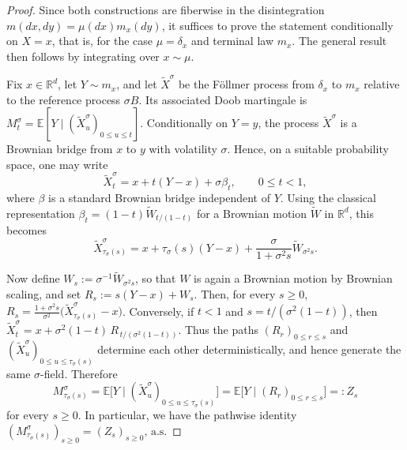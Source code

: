 \documentclass[reqno, a4paper]{amsart}
\theoremstyle{plain}
\theoremstyle{definition}
\theoremstyle{remark}
\numberwithin{equation}{section}
\numberwithin{theorem}{section}
\newcommand{\R}{\mathbb{R}}
\newcommand{\E}{\mathbb{E}}
\begin{document}
	\begin{proof}
		Since both constructions are fiberwise in the disintegration \(m(dx,dy)=\mu(dx)m_x(dy)\), it suffices to prove the statement conditionally on \(X=x\), that is, for the case \(\mu=\delta_x\) and terminal law \(m_x\). The general result then follows by integrating over \(x\sim\mu\).
		
		Fix \(x\in\R^d\), let \(Y\sim m_x\), and let \(\widetilde X^\sigma\) be the F\"ollmer process from \(\delta_x\) to \(m_x\) relative to the reference process \(\sigma B\). Its associated Doob martingale is \(M_t^\sigma=\E[Y\mid (\widetilde X_u^\sigma)_{0\le u\le t}]\). Conditionally on \(Y=y\), the process \(\widetilde X^\sigma\) is a Brownian bridge from \(x\) to \(y\) with volatility \(\sigma\). Hence, on a suitable probability space, one may write
		\[
		\widetilde X_t^\sigma=x+t(Y-x)+\sigma \beta_t,\qquad 0\le t<1,
		\]
		where \(\beta\) is a standard Brownian bridge independent of \(Y\). Using the classical representation \(\beta_t=(1-t)\widetilde W_{t/(1-t)}\) for a Brownian motion \(\widetilde W\) in \(\R^d\), this becomes
		\[
		\widetilde X_{\tau_\sigma(s)}^\sigma
		=
		x+\tau_\sigma(s)(Y-x)+\frac{\sigma}{1+\sigma^2 s}\widetilde W_{\sigma^2 s}.
		\]
		
		Now define \(W_s:=\sigma^{-1}\widetilde W_{\sigma^2 s}\), so that \(W\) is again a Brownian motion by Brownian scaling, and set \(R_s:=s(Y-x)+W_s\). Then, for every \(s\ge0\),
		$
		R_s=\frac{1+\sigma^2 s}{\sigma^2}\bigl(\widetilde X_{\tau_\sigma(s)}^\sigma-x\bigr)
		$. 
		Conversely, if \(t<1\) and \(s=t/(\sigma^2(1-t))\), then
		$
		\widetilde X_t^\sigma=x+\sigma^2(1-t)\,R_{\,t/(\sigma^2(1-t))}
		$. 
		Thus the paths \((R_r)_{0\le r\le s}\) and \((\widetilde X_u^\sigma)_{0\le u\le \tau_\sigma(s)}\) determine each other deterministically, and hence generate the same \(\sigma\)-field. Therefore
		\[
		M_{\tau_\sigma(s)}^\sigma
		=
		\E\big[Y\mid (\widetilde X_u^\sigma)_{0\le u\le \tau_\sigma(s)}\big]
		=
		\E\big[Y\mid (R_r)_{0\le r\le s}\big]
		=:Z_s
		\]
		for every \(s\ge0\). In particular,  we have the pathwise identity
		$
		(M^\sigma_{\tau_\sigma(s)})_{s\ge0}=(Z_s)_{s\ge0},\,\text{a.s.} 
		$ \qedhere
	\end{proof}
	
\end{document}
